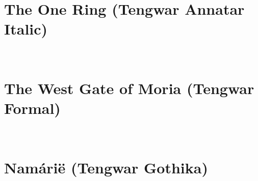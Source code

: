 \documentclass[12pt]{article}
\begin{document}
\thispagestyle{empty}

\section*{The One Ring (Tengwar Annatar Italic)}

\begin{center}
\tengwarannataritalic[2.5]
\Textendedcalma\TTthreedots\Tnuumen\Tessenuquerna\TTthreedots\Tungwe\Tando\Toore\TTrightcurl\Tumbar\Ttinco\TTthreedots\Tlambealt\TTrightcurl\Tquesse\TTdoublerightcurl
\Tromanperiod\Ts
\Textendedcalma\TTthreedots\Tnuumen\Tessenuquerna\TTthreedots\Tungwe\Tungwe\Tumbar\TTnasalizer\TTdot\Ttinco\TTthreedots\Tlambe\TTrightcurl
{}\\
\Textendedcalma\TTthreedots\Tnuumen\Tessenuquerna\TTthreedots\Tungwe\Tthuule\Troomen\Tquesse\TTthreedots\Ttinco\TTthreedots\Tlambealt\TTrightcurl\Tquesse\TTdoublerightcurl
\Tromanperiod\Ts
\Textendedungwe\TTthreedots\Tumbar\Toore\TTrightcurl\Tesse{}\Tmalta\TTrightcurl\Textendedcalma\TTdot\Ttelco\TTdot\Tquesse\Troomen\Tparma\TTnasalizer\TTdot\Ttinco\TTthreedots\Tlambe\TTrightcurl
\end{center}

\bigskip

\section*{The West Gate of Moria (Tengwar Formal)}

\begin{center}
\tengwarformal[2.0]
\Tyanta\Tnuumen\Tsilmenuquernaalt\Toore\Ts\Tando\Tuure\Troomen\Ttelco\Toore\Ts\Tosse\Troomen\Tosse\Toore\Ts\Tvala\Tanna\Troomen\Ttelco\TTdot\Tosse
\Ts\Tcentereddot\Ts
\Tparma\Tyanta\Tando\Tanna\Ts\Tvala\Tyanta\Tlambe\Tlambe\Tanna\Toore\Ts\Tosse\Ts\Tvala\Ttelco\TTdot\Tnuumen\Tanna\\
\Ttelco\Tvala\Ts\Toore\Tosse\Troomen\Tampa\Ttelco\Ts\Thyarmen\Tosse\TTtwodots\Toore\Ts\Tyanta\Taha\Tosse\Ttinco\TTnasalizer\Tcolon\Ts
\Tcalma\Tyanta\Tlambe\Tyanta\Tumbar\Troomen\Ttelco\TTdot\Tumbar\TTnasalizer\Tanna\Troomen\Ts\Tanna\Ts\Tyanta\Troomen\Tyanta\Tanga\Ttelco\TTdot\Tanna\Toore\Ts\Ttinco\Tyanta\TTtwodots\Tthuule\Tosse\Ttinco\TTnasalizer\Ts\Ttelco\TTdot\Ts\Tthuule\Ttelco\TTdot\Tvilya\Ts\Thyarmen\Ttelco\TTdot\Toore\Tcolon
\end{center}

\section*{Nam\'ari\"e (Tengwar Gothika)}
\end{document}

